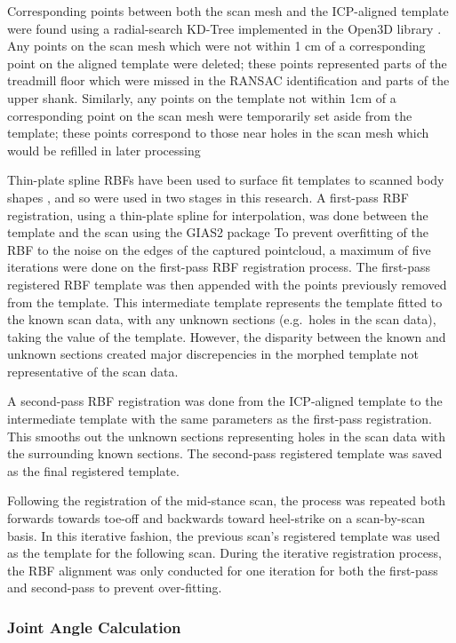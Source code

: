 \documentclass[defaultstyle,11pt]{comps}
\begin{document}
Corresponding points between both the scan mesh and the ICP-aligned template were found using a radial-search KD-Tree implemented in the Open3D library \citep{Zhou2018}.
Any points on the scan mesh which were not within 1 cm of a corresponding point on the aligned template were deleted; these points represented parts of the treadmill floor which were missed in the RANSAC identification and parts of the upper shank.
Similarly, any points on the template not within 1cm of a corresponding point on the scan mesh were temporarily set aside from the template; these points correspond to those near holes in the scan mesh which would be refilled in later processing

Thin-plate spline RBFs have been used to surface fit templates to scanned body shapes \citep{Park2015a}, and so were used in two stages in this research.
A first-pass RBF registration, using a thin-plate spline for interpolation, was done between the template and the scan using the GIAS2 package \citep{Zhang2016}
To prevent overfitting of the RBF to the noise on the edges of the captured pointcloud, a maximum of five iterations were done on the first-pass RBF registration process.
The first-pass registered RBF template was then appended with the points previously removed from the template.
This intermediate template represents the template fitted to the known scan data, with any unknown sections (e.g.~holes in the scan data), taking the value of the template.
However, the disparity between the known and unknown sections created major discrepencies in the morphed template not representative of the scan data.

A second-pass RBF registration was done from the ICP-aligned template to the intermediate template with the same parameters as the first-pass registration.
This smooths out the unknown sections representing holes in the scan data with the surrounding known sections.
The second-pass registered template was saved as the final registered template.

Following the registration of the mid-stance scan, the process was repeated both forwards towards toe-off and backwards toward heel-strike on a scan-by-scan basis.
In this iterative fashion, the previous scan's registered template was used as the template for the following scan.
During the iterative registration process, the RBF alignment was only conducted for one iteration for both the first-pass and second-pass to prevent over-fitting.

\hypertarget{joint-angle-calculation}{%
\subsubsection{Joint Angle Calculation}\label{joint-angle-calculation}}
\end{document}
